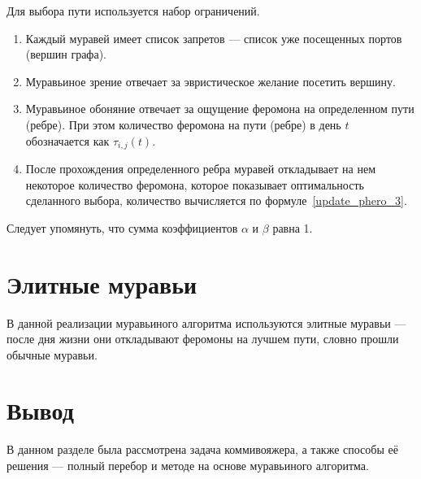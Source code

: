 Для выбора пути используется набор ограничений.
\begin{enumerate}
	\item Каждый муравей имеет список запретов --- список уже посещенных портов (вершин графа).
	\item Муравьиное зрение отвечает за эвристическое желание посетить вершину.
	\item Муравьиное обоняние отвечает за ощущение феромона на определенном пути (ребре). При этом количество феромона на пути (ребре) в день $t$ обозначается как $\tau_{i, j} (t)$.
	\item После прохождения определенного ребра муравей откладывает на нем некоторое количество феромона, которое показывает оптимальность сделанного выбора, количество вычисляется по формуле~\eqref{update_phero_3}.
\end{enumerate}

Следует упомянуть, что сумма коэффициентов $\alpha$ и $\beta$ равна 1.

\section*{Элитные муравьи}
В данной реализации муравьиного алгоритма используются элитные муравьи --- после дня жизни они откладывают феромоны на лучшем пути, словно прошли обычные муравьи.

\section*{Вывод}

В данном разделе была рассмотрена задача коммивояжера, а также способы её решения --- полный перебор и методе на основе муравьиного алгоритма.